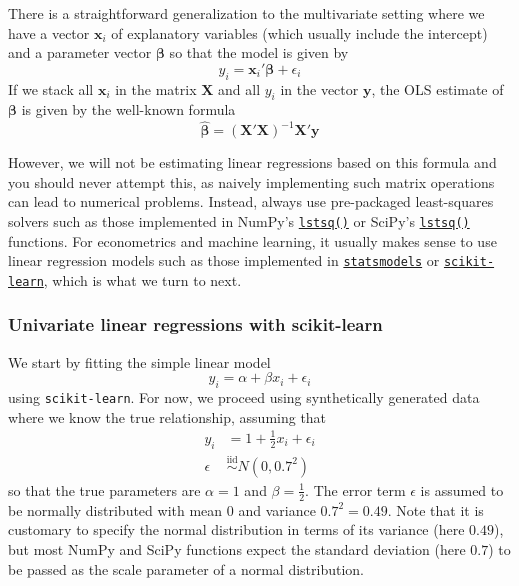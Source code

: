 \documentclass{scrartcl}
\begin{document}
There is a straightforward generalization to the multivariate setting
where we have a vector \(\mathbf{x}_i\) of explanatory variables (which
usually include the intercept) and a parameter vector \(\bm\beta\)
so that the model is given by \[
y_i = \mathbf{x}_i'\bm\beta + \epsilon_i
\] If we stack all \(\mathbf{x}_i\) in the matrix \(\mathbf{X}\) and all
\(y_i\) in the vector \(\mathbf{y}\), the OLS estimate of
\(\bm\beta\) is given by the well-known formula \[
\widehat{\bm\beta} = \left(\mathbf{X}'\mathbf{X}\right)^{-1} \mathbf{X}'\mathbf{y}
\]

However, we will not be estimating linear regressions based on this
formula and you should never attempt this, as naively implementing such
matrix operations can lead to numerical problems. Instead, always use
pre-packaged least-squares solvers such as those implemented in NumPy's
\href{https://numpy.org/doc/stable/reference/generated/numpy.linalg.lstsq.html}{\texttt{lstsq()}}
or SciPy's
\href{https://docs.scipy.org/doc/scipy/reference/generated/scipy.linalg.lstsq.html}{\texttt{lstsq()}}
functions. For econometrics and machine learning, it usually makes sense
to use linear regression models such as those implemented in
\href{https://www.statsmodels.org/stable/regression.html}{\texttt{statsmodels}}
or
\href{https://scikit-learn.org/stable/modules/generated/sklearn.linear_model.LinearRegression.html}{\texttt{scikit-learn}},
which is what we turn to next.

    \hypertarget{univariate-linear-regressions-with-scikit-learn}{%
\subsubsection{Univariate linear regressions with
scikit-learn}\label{univariate-linear-regressions-with-scikit-learn}}

We start by fitting the simple linear model \[
y_i = \alpha + \beta x_i + \epsilon_i
\] using \texttt{scikit-learn}. For now, we proceed using synthetically
generated data where we know the true relationship, assuming that \[
\begin{aligned}
y_i &= 1 + \frac{1}{2} x_i + \epsilon_i \\
\epsilon &\stackrel{\text{iid}}{\sim} N(0, 0.7^2)
\end{aligned}
\] so that the true parameters are \(\alpha = 1\) and
\(\beta = \frac{1}{2}\). The error term \(\epsilon\) is assumed to be
normally distributed with mean \(0\) and variance \(0.7^2 = 0.49\). Note
that it is customary to specify the normal distribution in terms of its
variance (here \(0.49\)), but most NumPy and SciPy functions expect the
standard deviation (here \(0.7\)) to be passed as the scale parameter of
a normal distribution.
\end{document}

